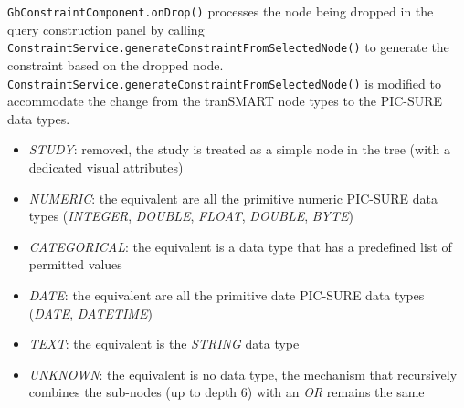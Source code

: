 \verb|GbConstraintComponent.onDrop()| processes the node being dropped in the query construction panel by calling \verb|ConstraintService.generateConstraintFromSelectedNode()| to generate the constraint based on the dropped node.
\verb|ConstraintService.generateConstraintFromSelectedNode()| is modified to accommodate the change from the tranSMART node types to the PIC-SURE data types.
\begin{itemize}
    \item \emph{STUDY}: removed, the study is treated as a simple node in the tree (with a dedicated visual attributes)
    \item \emph{NUMERIC}: the equivalent are all the primitive numeric PIC-SURE data types (\emph{INTEGER}, \emph{DOUBLE}, \emph{FLOAT}, \emph{DOUBLE}, \emph{BYTE})
    \item \emph{CATEGORICAL}: the equivalent is a data type that has a predefined list of permitted values
    \item \emph{DATE}: the equivalent are all the primitive date PIC-SURE data types (\emph{DATE}, \emph{DATETIME})
    \item \emph{TEXT}: the equivalent is the \emph{STRING} data type
    \item \emph{UNKNOWN}: the equivalent is no data type, the mechanism that recursively combines the sub-nodes (up to depth 6) with an \emph{OR} remains the same
\end{itemize}

